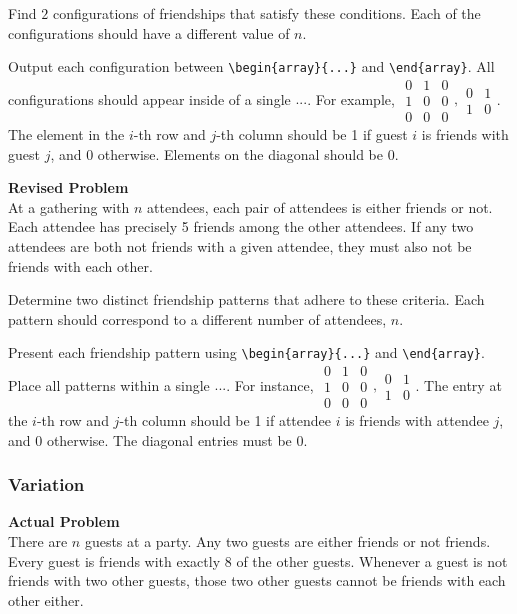 Find $2$ configurations of friendships that satisfy these conditions. Each of the configurations should have a different value of $n$.

Output each configuration between \verb|\begin{array}{...}| and \verb|\end{array}|. All configurations should appear inside of a single $\boxed{...}$. For example, $\boxed{\begin{array}{ccc}0 & 1 & 0 \\ 1 & 0 & 0 \\ 0 & 0 & 0\end{array},\begin{array}{cc}0 & 1 \\ 1 & 0\end{array}}$.
The element in the $i$-th row and $j$-th column should be 1 if guest $i$ is friends with guest $j$, and 0 otherwise. Elements on the diagonal should be 0.

\textbf{Revised Problem}\\
At a gathering with $n$ attendees, each pair of attendees is either friends or not. Each attendee has precisely 5 friends among the other attendees. If any two attendees are both not friends with a given attendee, they must also not be friends with each other.

Determine two distinct friendship patterns that adhere to these criteria. Each pattern should correspond to a different number of attendees, $n$.

Present each friendship pattern using \verb|\begin{array}{...}| and \verb|\end{array}|. Place all patterns within a single $\boxed{...}$. For instance, $\boxed{\begin{array}{ccc}0 & 1 & 0 \\ 1 & 0 & 0 \\ 0 & 0 & 0\end{array},\begin{array}{cc}0 & 1 \\ 1 & 0\end{array}}$.
The entry at the $i$-th row and $j$-th column should be 1 if attendee $i$ is friends with attendee $j$, and 0 otherwise. The diagonal entries must be 0.

\subsubsection{Variation}
\textbf{Actual Problem}\\
There are $n$ guests at a party. Any two guests are either friends or not friends. Every guest is friends with exactly 8 of the other guests. Whenever a guest is not friends with two other guests, those two other guests cannot be friends with each other either.

